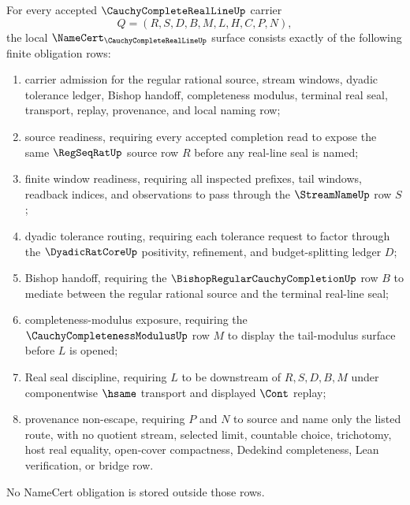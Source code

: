\begin{theorem}
\label{thm:cauchy-complete-real-line-namecert-obligations}
For every accepted $\CauchyCompleteRealLineUp$ carrier
$$
Q=(R,S,D,B,M,L,H,C,P,N),
$$
the local $\NameCert_{\CauchyCompleteRealLineUp}$ surface consists exactly of the following finite obligation rows:
\begin{enumerate}
\item carrier admission for the regular rational source, stream windows, dyadic tolerance ledger, Bishop handoff, completeness modulus, terminal real seal, transport, replay, provenance, and local naming row;
\item source readiness, requiring every accepted completion read to expose the same $\RegSeqRatUp$ source row $R$ before any real-line seal is named;
\item finite window readiness, requiring all inspected prefixes, tail windows, readback indices, and observations to pass through the $\StreamNameUp$ row $S$;
\item dyadic tolerance routing, requiring each tolerance request to factor through the $\DyadicRatCoreUp$ positivity, refinement, and budget-splitting ledger $D$;
\item Bishop handoff, requiring the $\BishopRegularCauchyCompletionUp$ row $B$ to mediate between the regular rational source and the terminal real-line seal;
\item completeness-modulus exposure, requiring the $\CauchyCompletenessModulusUp$ row $M$ to display the tail-modulus surface before $L$ is opened;
\item Real seal discipline, requiring $L$ to be downstream of $R,S,D,B,M$ under componentwise $\hsame$ transport and displayed $\Cont$ replay;
\item provenance non-escape, requiring $P$ and $N$ to source and name only the listed route, with no quotient stream, selected limit, countable choice, trichotomy, host real equality, open-cover compactness, Dedekind completeness, Lean verification, or bridge row.
\end{enumerate}
No NameCert obligation is stored outside those rows.
\end{theorem}
